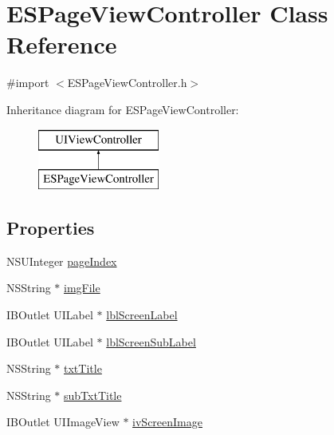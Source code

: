 \hypertarget{interface_e_s_page_view_controller}{}\section{E\+S\+Page\+View\+Controller Class Reference}
\label{interface_e_s_page_view_controller}


{\ttfamily \#import $<$E\+S\+Page\+View\+Controller.\+h$>$}

Inheritance diagram for E\+S\+Page\+View\+Controller\+:\begin{figure}[H]
\begin{center}
\leavevmode
\includegraphics[height=2.000000cm]{interface_e_s_page_view_controller}
\end{center}
\end{figure}
\subsection*{Properties}
\begin{DoxyCompactItemize}
\item 
N\+S\+U\+Integer \hyperlink{interface_e_s_page_view_controller_acd8b6a09ffbec0851c2a21f82ff4cb59}{page\+Index}
\item 
N\+S\+String $\ast$ \hyperlink{interface_e_s_page_view_controller_ac2b73c2572d8221b108e2c7a79d7e4eb}{img\+File}
\item 
I\+B\+Outlet U\+I\+Label $\ast$ \hyperlink{interface_e_s_page_view_controller_a37a2106faf34602108ad2d3303ab8bdc}{lbl\+Screen\+Label}
\item 
I\+B\+Outlet U\+I\+Label $\ast$ \hyperlink{interface_e_s_page_view_controller_ac253c976e1b82035d6205b1abcbe18bc}{lbl\+Screen\+Sub\+Label}
\item 
N\+S\+String $\ast$ \hyperlink{interface_e_s_page_view_controller_a6bdeac95e5afc8ef09c069a9d32e80bc}{txt\+Title}
\item 
N\+S\+String $\ast$ \hyperlink{interface_e_s_page_view_controller_aa2a08bb2eb5012b0c731fc14954114a8}{sub\+Txt\+Title}
\item 
I\+B\+Outlet U\+I\+Image\+View $\ast$ \hyperlink{interface_e_s_page_view_controller_af89fee72967118c2b6223647191cf380}{iv\+Screen\+Image}
\end{DoxyCompactItemize}


